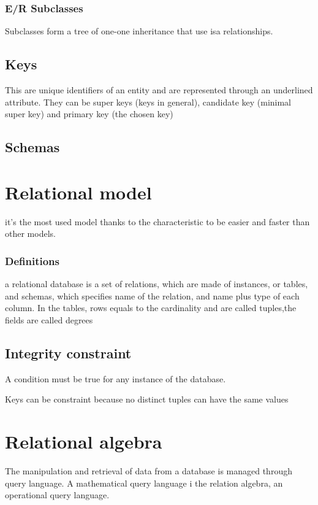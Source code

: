 \documentclass[12pt, a4paper]{article}
\begin{document}
\subsubsection*{E/R Subclasses}
Subclasses form a tree of one-one inheritance that use isa relationships. 

\subsection{Keys}
This are unique identifiers of an entity and are represented through an underlined attribute. They can
be super keys (keys in general), candidate key (minimal super key) and primary key (the chosen key)

\subsection{Schemas}

\newpage
\section{Relational model}
it's the most used model thanks to the characteristic to be easier and faster than other models.

\subsubsection*{Definitions}
a relational database is a set of relations, which are made of instances, or tables, and schemas, which specifies
name of the relation, and name plus type of each column. In the tables, rows equals to the cardinality and are 
called tuples,the fields are called degrees

\subsection{Integrity constraint}
A condition must be true for any instance of the database.

Keys can be constraint because no distinct tuples can have the same values 

\newpage
\section{Relational algebra}
The manipulation and retrieval of data from a database is managed through query language. A mathematical query
language i the relation algebra, an operational query language.
\end{document}
